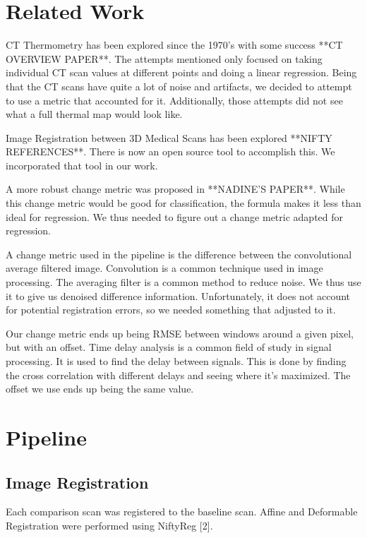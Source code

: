 \documentclass[]{spie}  %
\begin{document}
\section{Related Work}

CT Thermometry has been explored since the 1970's with some success **CT OVERVIEW PAPER**. The attempts mentioned only focused on taking individual CT scan values at different points and doing a linear regression. Being that the CT scans have quite a lot of noise and artifacts, we decided to attempt to use a metric that accounted for it. Additionally, those attempts did not see what a full thermal map would look like.

Image Registration between 3D Medical Scans has been explored **NIFTY REFERENCES**. There is now an open source tool to accomplish this. We incorporated that tool in our work.  

A more robust change metric was proposed in **NADINE'S PAPER**. While this change metric would be good for classification, the formula makes it less than ideal for regression. We thus needed to figure out a change metric adapted for regression.

A change metric used in the pipeline is the difference between the convolutional average filtered image. Convolution is a common technique used in image processing. The averaging filter is a common method to reduce noise. We thus use it to give us denoised difference information. Unfortunately, it does not account for potential registration errors, so we needed something that adjusted to it. 

Our change metric ends up being RMSE between windows around a given pixel, but with an offset. Time delay analysis is a common field of study in signal processing. It is used to find the delay between signals. This is done by finding the cross correlation with different delays and seeing where it's maximized. The offset we use ends up being the same value. 

\section{Pipeline}

\subsection{Image Registration} 

Each comparison scan was registered to the baseline scan. Affine and Deformable Registration were performed using NiftyReg [2].
\end{document}
